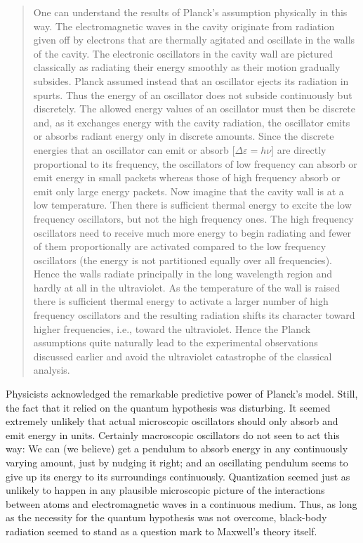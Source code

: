 \begin{quote}
One can understand the results of Planck's assumption physically in this
way. The electromagnetic waves in the cavity originate from radiation
given off by electrons that are thermally agitated and oscillate in the
walls of the cavity. The electronic oscillators in the cavity wall are
pictured classically as radiating their energy smoothly as their motion
gradually subsides. Planck assumed instead that an oscillator ejects its
radiation in spurts. Thus the energy of an oscillator does not subside
continuously but discretely. The allowed energy values of an oscillator
must then be discrete and, as it exchanges energy with the cavity
radiation, the oscillator emits or absorbs radiant energy only in
discrete amounts. Since the discrete energies that an oscillator can
emit or absorb [$\Delta\varepsilon = h\nu$] are directly proportional to its
frequency, the oscillators of low frequency can absorb or emit energy in
small packets whereas those of high frequency absorb or emit only large
energy packets. Now imagine that the cavity wall is at a low
temperature. Then there is sufficient thermal energy to excite the low
frequency oscillators, but not the high frequency ones. The high
frequency oscillators need to receive much more energy to begin
radiating and fewer of them proportionally are activated compared to the
low frequency oscillators (the energy is not partitioned equally over
all frequencies). Hence the walls radiate principally in the long
wavelength region and hardly at all in the ultraviolet. As the
temperature of the wall is raised there is sufficient thermal energy to
activate a larger number of high frequency oscillators and the resulting
radiation shifts its character toward higher frequencies, i.e., toward
the ultraviolet. Hence the Planck assumptions quite naturally lead to
the experimental observations discussed earlier and avoid the
ultraviolet catastrophe of the classical analysis.
\end{quote}

Physicists acknowledged the remarkable predictive power of Planck's
model. Still, the fact that it relied on the quantum hypothesis was
disturbing. It seemed extremely unlikely that actual microscopic
oscillators should only absorb and emit energy in units. Certainly
macroscopic oscillators do not seen to act this way: We can (we believe)
get a pendulum to absorb energy in any continuously varying amount, just
by nudging it right; and an oscillating pendulum seems to give up its
energy to its surroundings continuously. Quantization seemed just as
unlikely to happen in any plausible microscopic picture of the
interactions between atoms and electromagnetic waves in a continuous
medium. Thus, as long as the necessity for the quantum hypothesis was
not overcome, black-body radiation seemed to stand as a question mark to
Maxwell's theory itself.
